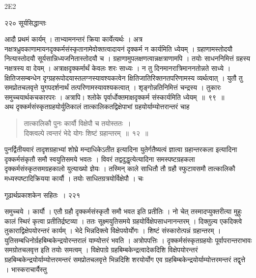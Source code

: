 \documentclass[11pt, openany]{book}
\begin{document}
{\tiny{2E2}}

\newpage

\noindent २२० \hspace{4cm} सूर्यसिद्धान्तः
\vspace{1cm}


\noindent आदौ प्रथमं कार्यम् । ताभ्यामनन्तरं क्रिया कार्येत्यर्थः । अत्र नक्षत्रध्रुवकाणामायनदृक्कर्मसंस्कृतानामेवोक्तत्वादायनं दृक्कर्म न कार्यमिति ध्येयम् । ग्रहाणामस्तोदयौ नित्यास्तोदयौ सूर्यसान्निध्यजनितास्तोदयौ च । ग्रहाणामुपलक्षणत्वान्नक्षत्राणामपि । तयोः साधननिमित्तं ग्रहस्य नक्षत्रस्य वा देयम् । अत्राक्षदृक्कर्मार्थं केवलः शरः साध्यः । न तु दिनमानरात्रिमाननतोन्नते साध्ये । क्षितिजसम्बन्धेन दृग्ग्रहरूपोदयास्तलग्नस्यावश्यकत्वेन क्षितिजातिरिक्तनतपरिणामस्य व्यर्थत्वात् । युतौ तु समप्रोतचलवृत्ते युगपदर्शनार्थं तत्परिणामस्यावश्यकत्वात् । शृङ्गोन्नतिनिमित्तं चन्द्रस्य । तुकारः समुच्चयार्थकचकारपरः । अत्रापि। श्लोके पृर्वार्धोक्तमाक्षदृक्कर्म संस्कार्यमिति ध्येयम्~॥~९९~॥\\
\noindent अथ दृक्कर्मसंस्कृतग्रहयोर्युतिकालं तात्कालिकतद्विक्षेपाभां ग्रहयोर्याम्योत्तरान्तरं चाह\textendash


\begin{quote}
{\ssi तात्कालिकौ पुनः कार्यौ विक्षेपौ च तयोस्ततः~।\\
 दिक्त्वल्पे त्वन्तरं भेदे योगः शिष्टं ग्रहान्तरम्~॥~१२~॥ }
\end{quote}


 पुनर्द्वितीयवारं तादृशग्रहाभ्यां शोघ्रे मन्दाधिकेऽतीत इत्यादिना युतेर्गतैष्यत्वं ज्ञात्वा ग्रहान्तरकला इत्यादिना दृक्कर्मसंकृतौ समौ स्वयुतिसमये भवतः । विवरं तद्वदुद्धृत्येत्यादिना समस्पष्टग्रहकला दृक्कर्मसंस्कृतसमग्रहकालो युत्याख्यो ज्ञेयः । तस्मिन् काले साधितौ तौ ग्रहौ स्फुटावसमौ तात्कालिकौ मध्यस्पष्टादिक्रियया कार्यौ । तयोः साधितग्रत्रयोर्विक्षेपौ । चः \textendash


\newpage

 \hspace{3cm} गूढार्थप्रकाशकेन सहितः~। \hfill २२१
\vspace{1cm}


\noindent समुच्चये । कार्यौ । एतौ ग्रहौ दृक्कर्मसंस्कृतौ समौ भवत इति प्रतीतिः । नो चेत् तस्मादप्युक्तरीत्या मुहुः कालं स्थिरं कृत्वा प्रतीतिर्द्रष्टव्या । ततः सूक्ष्मयुतिसमये ग्रहयोर्विक्षेपसाधनानन्तरम् । दिक्तुल्य एकदिक्त्वे तुकाराद्विक्षेपयोरन्तरं कार्यम् । भेदे भिन्नदिक्त्वे विक्षेपयोर्योगः । शिष्टं संस्कारोत्पन्नं ग्रहान्तरम् । युतिसम्बधिनोर्ग्रहबिम्बकेन्द्रयोरन्तरालं याम्योत्तरं भवति । अत्रोपपत्तिः । दृक्कर्मसंस्कृतग्रहयोः पूर्वापरान्तराभावः समग्रोतचलवृत्त इति तयोः समत्वम् । विक्षेपाग्रे ग्रहबिम्बकेन्द्रत्वादेकदिशि विक्षेपयोरन्तरं ग्रहबिम्बकेन्द्रयोर्याम्योत्तरमन्तरं समप्रोतचलवृत्ते भिन्नदिशि शरयोर्योग एव ग्रहबिम्बकेन्द्रयोर्याम्योत्तरमन्तरं तद्वृत्ते । भास्कराचार्यैस्तु\textendash 
\end{document}
